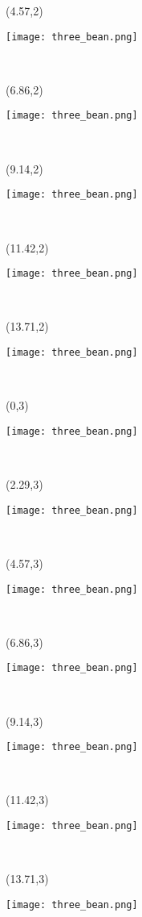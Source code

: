 \documentclass[a4paper]{article}
\newcommand{\myXthreeBean}[0]{
\texttt{[image: three\_bean.png]}
}
\newcommand{\mycard}[5]{%
	\tiny #1 #2
	\hspace{-0.75cm} \large#3\\
}
\begin{document}
\begin{textblock}{2.29}(4.57,2)
\mycard{}{}{
\myXthreeBean
}{}{} 
\end{textblock}

\begin{textblock}{2.29}(6.86,2)
\mycard{}{}{
\myXthreeBean
}{}{} 
\end{textblock}

\begin{textblock}{2.29}(9.14,2)
\mycard{}{}{
\myXthreeBean
}{}{} 
\end{textblock}

\begin{textblock}{2.29}(11.42,2)
\mycard{}{}{
\myXthreeBean
}{}{} 
\end{textblock}

\begin{textblock}{2.29}(13.71,2)
\mycard{}{}{
\myXthreeBean
}{}{} 
\end{textblock}


\begin{textblock}{2.29}(0,3)
\mycard{}{}{
\myXthreeBean
}{}{} 
\end{textblock}

\begin{textblock}{2.29}(2.29,3)
\mycard{}{}{
\myXthreeBean
}{}{} 
\end{textblock}

\begin{textblock}{2.29}(4.57,3)
\mycard{}{}{
\myXthreeBean
}{}{} 
\end{textblock}

\begin{textblock}{2.29}(6.86,3)
\mycard{}{}{
\myXthreeBean
}{}{} 
\end{textblock}

\begin{textblock}{2.29}(9.14,3)
\mycard{}{}{
\myXthreeBean
}{}{} 
\end{textblock}

\begin{textblock}{2.29}(11.42,3)
\mycard{}{}{
\myXthreeBean
}{}{} 
\end{textblock}

\begin{textblock}{2.29}(13.71,3)
\mycard{}{}{
\myXthreeBean
}{}{} 
\end{textblock}
\end{document}
